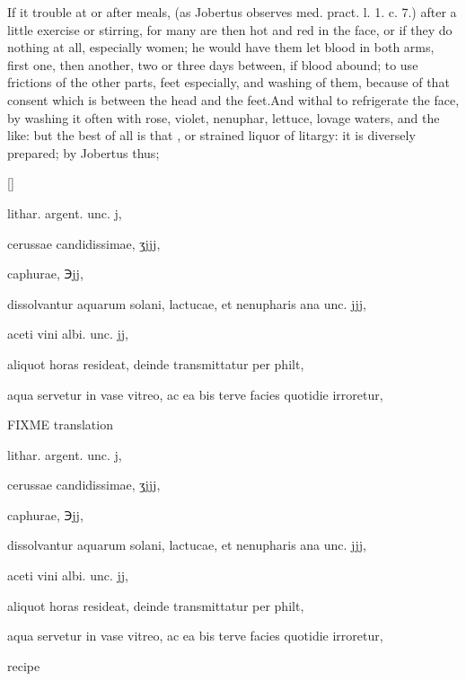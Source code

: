 If it trouble at or after meals, (as Jobertus observes \textlatin{med.
pract. l. 1. c. 7.}) after a little exercise or stirring, for many are
then hot and red in the face, or if they do nothing at all, especially
women; he would have them let blood in both arms, first one, then
another, two or three days between, if blood abound; to use frictions
of the other parts, feet especially, and washing of them, because of
that consent which is between the head and the feet.And withal to
refrigerate the face, by washing it often with rose, violet, nenuphar,
lettuce, lovage waters, and the like: but the best of all is that , or strained liquor of litargy: it is diversely prepared; by
Jobertus thus;
%
\vspace{-\baselineskip}
\begin{Prescription}[H]
[\baselineskip]
\begin{prescriptionbox}{}{}
\item \textlatin{lithar. argent. unc. j},
\item \textlatin{cerussae candidissimae, ʒjjj},
\item \textlatin{caphurae, ℈jj},
\item \textlatin{dissolvantur aquarum solani, lactucae, et nenupharis ana unc. jjj},
\item \textlatin{aceti vini albi. unc. jj},
\item \textlatin{aliquot horas resideat, deinde transmittatur per philt},
\item \textlatin{aqua servetur in vase vitreo, ac ea bis terve facies quotidie irroretur},
\end{prescriptionbox}
\begin{prescriptionbox}{FIXME translation}{}
\item \textlatin{lithar. argent. unc. j},
\item \textlatin{cerussae candidissimae, ʒjjj},
\item \textlatin{caphurae, ℈jj},
\item \textlatin{dissolvantur aquarum solani, lactucae, et nenupharis ana unc. jjj},
\item \textlatin{aceti vini albi. unc. jj},
\item \textlatin{aliquot horas resideat, deinde transmittatur per philt},
\item \textlatin{aqua servetur in vase vitreo, ac ea bis terve facies quotidie irroretur},
\end{prescriptionbox}
\caption{ recipe}
\end{Prescription}%

